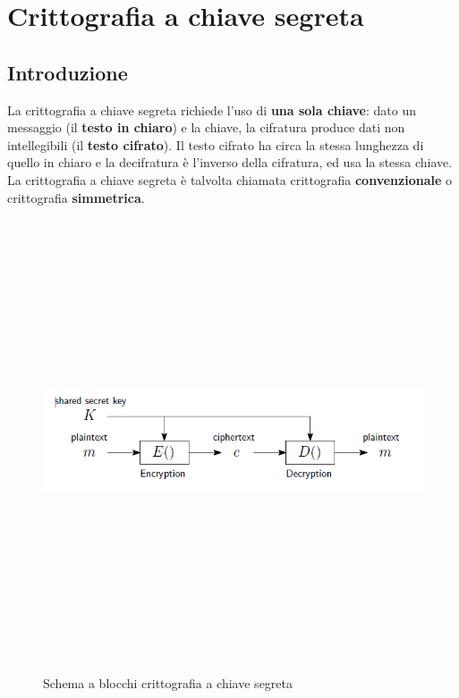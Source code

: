 \chapter{Crittografia a chiave segreta} \label{ch:secretkey}

\section{Introduzione}
La crittografia a chiave segreta richiede l'uso di \textbf{una sola chiave}: dato un messaggio (il \textbf{testo in chiaro}) e la chiave, la cifratura produce dati non intellegibili (il \textbf{testo cifrato}). Il testo cifrato ha circa la stessa lunghezza di quello in chiaro e la decifratura è l'inverso della cifratura, ed usa la stessa chiave. La crittografia a chiave segreta è talvolta chiamata crittografia \textbf{convenzionale} o crittografia \textbf{simmetrica}.
\begin{figure}[htbp]
	\centering%
	\subfigure%
	{\includegraphics[height=13cm, width=13cm, keepaspectratio]{Immagini/chiave_segreta/segreta_schema_blocchi.png}}
	\caption{Schema a blocchi crittografia a chiave segreta \label{fig:segreta_schema_blocchi}} 	
\end{figure}

